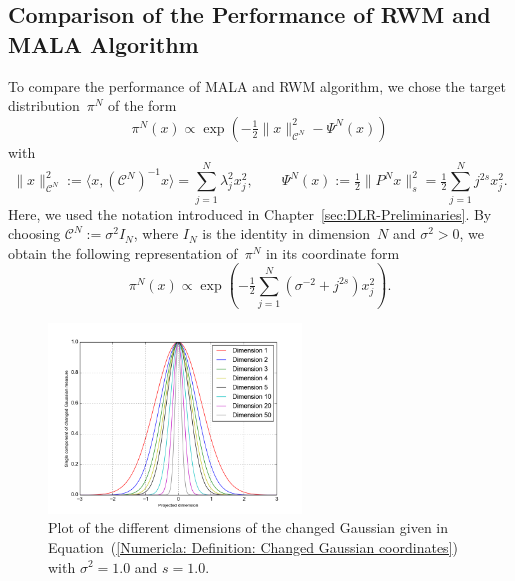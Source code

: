 \subsection{Comparison of the Performance of RWM and MALA Algorithm}

To compare the performance of MALA and RWM algorithm, we chose the target distribution~$\pi^N$ of the form
\begin{equation}
 \label{Numerical: Definition: Changed Gaussian}
 \pi^N (x) \varpropto \exp \left(- \tfrac{1}{2} \| x \|_{\mathcal{C}^N}^2 - \Psi^N (x) \right)
\end{equation}
with
\begin{equation}
 \label{Numerical: Definition: Psi^N and C^N}
 \| x \|_{\mathcal{C}^N}^2 := \langle x, (\mathcal{C}^N)^{-1}x \rangle = \sum_{j=1}^N \lambda_j^2 x_j^2, \qquad \Psi^N (x) := \tfrac{1}{2} \|P^N x \|^2_{s}=\tfrac{1}{2} \sum_{j=1}^{N} j^{2s}x_j^2.
\end{equation}
Here, we used the notation introduced in Chapter~\ref{sec:DLR-Preliminaries}. By choosing $\mathcal{C}^N := \sigma^2 I_N$, where $I_N$ is the identity in dimension~$N$ and $\sigma^2>0$, we obtain the following representation of~$\pi^N$ in its coordinate form
\begin{equation}
\label{Numericla: Definition: Changed Gaussian coordinates}
 \pi^N (x) \varpropto \exp \left( -\tfrac{1}{2} \sum_{j=1}^N ( \sigma^{-2} + j^{2s}) x_j^2   \right).
\end{equation}

\begin{figure}%
 \begin{center} 
  \includegraphics[width=0.60\textwidth]{figure_ChangedGaussian}
 \end{center}
  \caption{Plot of the different dimensions of the changed Gaussian given in Equation~(\ref{Numericla: Definition: Changed Gaussian coordinates}) with $\sigma^2 = 1.0$ and $s = 1.0$.}
  \label{fig:target: Changed Gaussian}
\end{figure}

